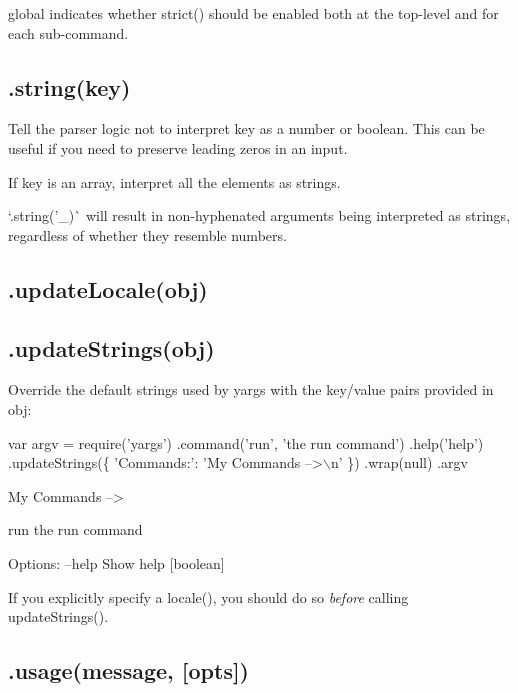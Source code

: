 {\ttfamily global} indicates whether {\ttfamily strict()} should be enabled both at the top-\/level and for each sub-\/command.

\subsection*{\label{_string}%
.string(key) }

Tell the parser logic not to interpret {\ttfamily key} as a number or boolean. This can be useful if you need to preserve leading zeros in an input.

If {\ttfamily key} is an array, interpret all the elements as strings.

`.string('\+\_\+\textquotesingle{})\`{} will result in non-\/hyphenated arguments being interpreted as strings, regardless of whether they resemble numbers.

\subsection*{.update\+Locale(obj) }

\subsection*{.update\+Strings(obj) }

Override the default strings used by yargs with the key/value pairs provided in {\ttfamily obj}\+:


\begin{DoxyCode}
var argv = require('yargs')
  .command('run', 'the run command')
  .help('help')
  .updateStrings(\{
    'Commands:': 'My Commands -->\(\backslash\)n'
  \})
  .wrap(null)
  .argv
\end{DoxyCode}







\begin{DoxyCode}
My Commands -->

  run  the run command

Options:
  --help  Show help  [boolean]
\end{DoxyCode}


If you explicitly specify a {\ttfamily locale()}, you should do so {\itshape before} calling {\ttfamily update\+Strings()}.

\subsection*{.usage(message, \mbox{[}opts\mbox{]}) }

